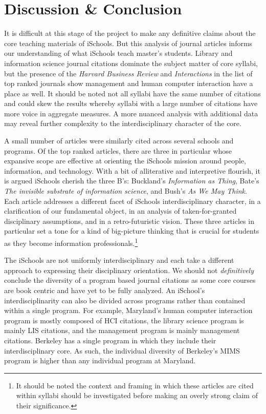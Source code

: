 \documentclass[10pt, letterpaper]{article}
\begin{document}
\section{Discussion \& Conclusion}
It is difficult at this stage of the project to make any definitive claims about the core teaching materials of iSchools. But this analysis of journal articles informs our understanding of what iSchools teach master's students. Library and information science journal citations dominate the subject matter of core syllabi, but the presence of the \textit{Harvard Business Review} and \textit{Interactions} in the list of top ranked journals show management and human computer interaction have a place as well. It should be noted not all syllabi have the same number of citations and could skew the results whereby syllabi with a large number of citations have more voice in aggregate measures. A more nuanced analysis with additional data may reveal further complexity to the interdisciplinary character of the core.

A small number of articles were similarly cited across several schools and programs. Of the top ranked articles, there are three in particular whose expansive scope are effective at orienting the iSchools mission around people, information, and technology. With a bit of alliterative and interpretive flourish, it is argued iSchools cherish the three B's: Buckland's \textit{Information as Thing}, Bate's \textit{The invisible substrate of information science}, and Bush's \textit{As We May Think}. Each article addresses a different facet of iSchools interdisciplinary character, in a clarification of our fundamental object, in an analysis of taken-for-granted disciplinary assumptions, and in a retro-futuristic vision. These three articles in particular set a tone for a kind of big-picture thinking that is crucial for students as they become information professionals.\footnote{It should be noted the context and framing in which these articles are cited within syllabi should be investigated before making an overly strong claim of their significance.}

The iSchools are not uniformly interdisciplinary and each take a different approach to expressing their disciplinary orientation. We should not \textit{definitively} conclude the diversity of a program based journal citations as some core courses are book centric and have yet to be fully analyzed. An iSchool's interdisciplinarity can also be divided across programs rather than contained within a single program. For example, Maryland's human computer interaction program is mostly composed of HCI citations, the library science program is mainly LIS citations, and the management program is mainly management citations. Berkeley has a single program in which they include their interdisciplinary core. As such, the individual diversity of Berkeley's MIMS program is higher than any individual program at Maryland. 
\end{document}
